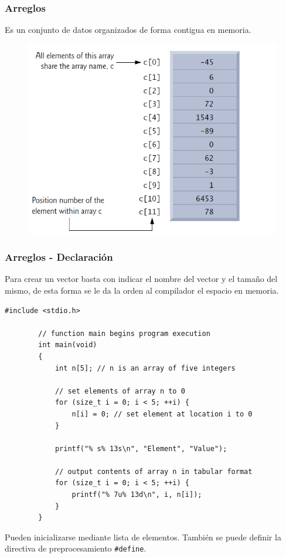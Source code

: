 \documentclass[10.5pt,scale=1.0,t,aspectratio=169,hyperref={pdfpagelabels=false}]{beamer}
\begin{document}
\begin{frame}
	\frametitle{Arreglos}
	Es un conjunto de datos organizados de forma contigua en memoria.  
	\begin{figure}
		\centering
		\includegraphics[scale=0.5]{Array}
	\end{figure}
\end{frame}
\begin{frame}[fragile]
	\frametitle{Arreglos - Declaración}
	Para crear un vector basta con indicar el nombre del vector y el tamaño del mismo, de esta forma se le da la orden al compilador el espacio en memoria. 
	\begin{lstlisting}[style=CStyle]
		#include <stdio.h>
		
		// function main begins program execution
		int main(void)
		{
			int n[5]; // n is an array of five integers
			
			// set elements of array n to 0
			for (size_t i = 0; i < 5; ++i) {
				n[i] = 0; // set element at location i to 0
			}
			
			printf("% s% 13s\n", "Element", "Value");
			
			// output contents of array n in tabular format
			for (size_t i = 0; i < 5; ++i) {
				printf("% 7u% 13d\n", i, n[i]);
			}
		}
	\end{lstlisting}
	Pueden inicializarse mediante lista de elementos. También se puede definir la directiva de preprocesamiento \texttt{\#define}. 
\end{frame}
\end{document}
